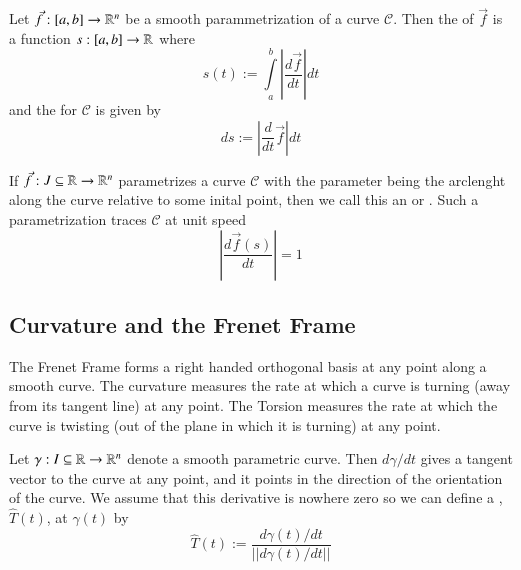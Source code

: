 \begin{appendices}
    \begin{defn}
        Let $\vec{f}:[a,b] \rightarrow \mathbb R^n$ be a smooth parammetrization of a curve $\mathscr{C}$. Then the  of $\vec{f}$ is a function $s:[a,b] \rightarrow \mathbb R$ where \begin{equation}
            s(t) := \int\limits_a^b\left|\frac{d\vec{f}}{dt}\right|dt
        \end{equation}
        and the  for $\mathscr{C}$ is given by \begin{equation}
            ds := \left|\frac{d}{dt}\vec{f}\right|dt
        \end{equation}
    \end{defn}

    \begin{defn}
        If $\vec{f}:J\subseteq \mathbb R\rightarrow \mathbb R^n$ parametrizes a curve $\mathscr{C}$ with the parameter being the arclenght along the curve relative to some inital point, then we call this an  or . Such a parametrization traces $\mathscr{C}$ at unit speed \begin{equation}
            \left|\frac{d\vec{f}(s)}{dt}\right| = 1
        \end{equation}
    \end{defn}
    

    

    \subsection{Curvature and the Frenet Frame}

    The Frenet Frame forms a right handed orthogonal basis at any point along a smooth curve.  The curvature measures the rate at which a curve is turning (away from its tangent line) at any point. The Torsion measures the rate at which the curve is twisting (out of the plane in which it is turning) at any point.

    \begin{defn}
        Let $\gamma:I\subseteq \mathbb R\rightarrow \mathbb R^n$ denote a smooth parametric curve. Then $d\gamma/dt$ gives a tangent vector to the curve at any point, and it points in the direction of the orientation of the curve. We assume that this derivative is nowhere zero so we can define a , $\hat{T}(t)$, at $\gamma(t)$ by \begin{equation*}
            \hat{T}(t) := \frac{d\gamma(t)/dt}{||d\gamma(t)/dt||}
        \end{equation*}
    \end{defn}
    

\end{appendices}
